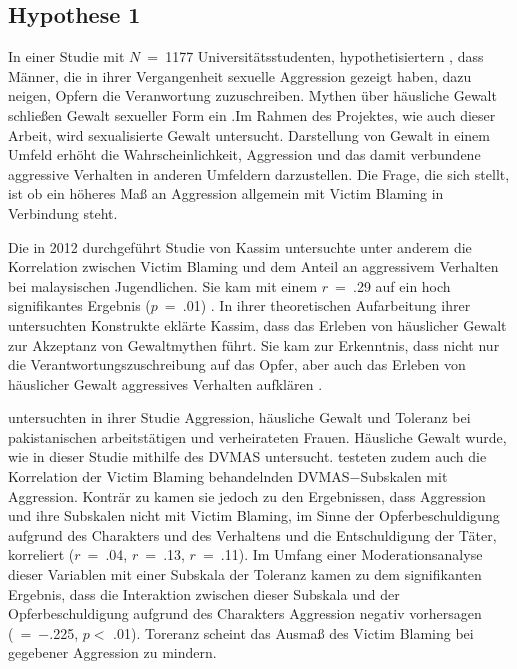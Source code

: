 \subsection{Hypothese 1}  \label{subsec_2.2.1}
In einer Studie mit $N$~=~1177 Universitätsstudenten, hypothetisiertern \textcite{H1_1993}, dass Männer, die in ihrer Vergangenheit sexuelle Aggression gezeigt haben, dazu neigen, Opfern die Veranwortung zuzuschreiben. Mythen über häusliche Gewalt schließen Gewalt sexueller Form ein \parencite{H1_Poli_2022}.Im Rahmen des Projektes, wie auch dieser Arbeit, wird sexualisierte Gewalt untersucht. Darstellung von Gewalt in einem Umfeld erhöht die Wahrscheinlichkeit, Aggression und das damit verbundene aggressive Verhalten in anderen Umfeldern darzustellen. Die Frage, die sich stellt, ist ob ein höheres Maß an Aggression allgemein mit Victim Blaming in Verbindung steht.

Die in 2012 durchgeführt Studie von Kassim untersuchte unter anderem die Korrelation zwischen Victim Blaming und dem Anteil an aggressivem Verhalten bei malaysischen Jugendlichen. Sie kam mit einem $r$~=~.29 auf ein hoch signifikantes Ergebnis ($p$~=~.01) \parencite{H1_malasia_2012}. In ihrer theoretischen Aufarbeitung ihrer untersuchten Konstrukte eklärte Kassim, dass das Erleben von häuslicher Gewalt zur Akzeptanz von Gewaltmythen führt. Sie kam zur Erkenntnis, dass nicht nur die Verantwortungszuschreibung auf das Opfer, aber auch das Erleben von häuslicher Gewalt aggressives Verhalten aufklären \parencite{H1_malasia_2012}.

\textcite{H1_moderation_2020} untersuchten in ihrer Studie Aggression, häusliche Gewalt und Toleranz bei pakistanischen arbeitstätigen und verheirateten Frauen. Häusliche Gewalt wurde, wie in dieser Studie mithilfe des DVMAS untersucht. \textcite{H1_moderation_2020} testeten zudem auch die Korrelation der Victim Blaming behandelnden DVMAS$-$Subskalen mit Aggression. Konträr zu \textcite{H1_malasia_2012} kamen sie jedoch zu den Ergebnissen, dass Aggression und ihre Subskalen nicht mit Victim Blaming, im Sinne der Opferbeschuldigung aufgrund des Charakters und des Verhaltens und die Entschuldigung der Täter, korreliert ($r$~=~.04, $r$~=~.13, $r$~=~.11). Im Umfang einer Moderationsanalyse dieser Variablen mit einer Subskala der Toleranz kamen \textcite{H1_moderation_2020} zu dem signifikanten Ergebnis, dass die Interaktion zwischen dieser Subskala und der Opferbeschuldigung aufgrund des Charakters Aggression negativ vorhersagen (\textbeta~=~$-$.225, $p<$ .01). Toreranz scheint das Ausmaß des Victim Blaming bei gegebener Aggression zu mindern.

